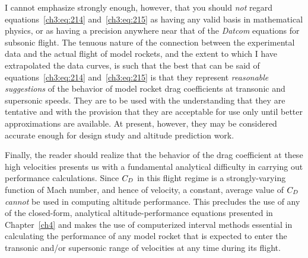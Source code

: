 I cannot emphasize strongly enough, however, that you
should \emph{not} regard equations~\eqref{ch3:eq:214} and~\eqref{ch3:eq:215} as having any valid
basis in mathematical physics, or as having a precision anywhere
near that of the \emph{Datcom} equations for subsonic flight. The
tenuous nature of the connection between the experimental data
and the actual flight of model rockets, and the extent to which
I have extrapolated the data curves, is such that the best that
can be said of equations~\eqref{ch3:eq:214} and~\eqref{ch3:eq:215} is that they represent
\emph{reasonable suggestions} of the behavior of model rocket drag
coefficients at transonic and supersonic speeds. They are to
be used with the understanding that they are tentative and
with the provision that they are acceptable for use only until
better approximations are available. At present, however,
they may be considered accurate enough for design study and
altitude prediction work.

Finally, the reader should realize that the behavior of
the drag coefficient at these high velocities presents us with
a fundamental analytical difficulty in carrying out performance
calculations. Since $C_{D}$ in this flight regime is a strongly-varying
function of Mach number, and hence of velocity, a
constant, average value of $C_{D}$ \emph{cannot} be used in computing
altitude performance. This precludes the use of any of the
closed-form, analytical altitude-performance equations presented
in Chapter~\ref{ch4} and makes the use of computerized interval methods
essential in calculating the performance of any model rocket
that is expected to enter the transonic and/or supersonic
range of velocities at any time during its flight.
